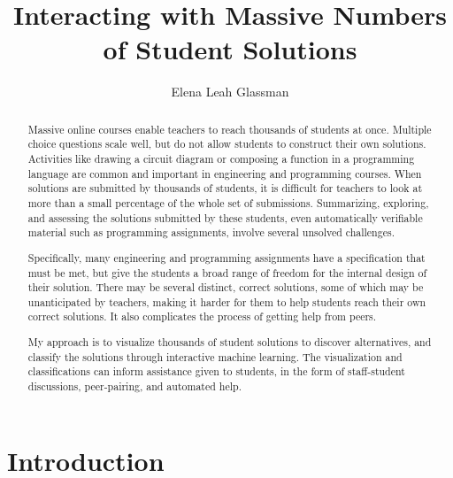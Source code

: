 \documentclass{sigchi}
\begin{document}
\title{Interacting with Massive Numbers of Student Solutions}

\author{
  \alignauthor Elena Leah Glassman 
}

\maketitle

\begin{abstract}
Massive online courses enable teachers to reach thousands of students at once. Multiple choice questions scale well, but do not allow students to construct their own solutions. Activities like drawing a circuit diagram or composing a function in a programming language are common and important in engineering and programming courses. When solutions are submitted by thousands of students, it is difficult for teachers to look at more than a small percentage of the whole set of submissions. Summarizing, exploring, and assessing the solutions submitted by these students, even automatically verifiable material such as programming assignments, involve several unsolved challenges. 

Specifically, many engineering and programming assignments have a specification that must be met, but give the students a broad range of freedom for the internal design of their solution. There may be several distinct, correct solutions, some of which may be unanticipated by teachers, making it harder for them to help students reach their own correct solutions. It also complicates the process of getting help from peers. 

My approach is to visualize thousands of student solutions to discover alternatives, and classify the solutions through interactive machine learning. The visualization and classifications can inform assistance given to students, in the form of staff-student discussions, peer-pairing, and automated help.
\end{abstract}



\section{Introduction}
\end{document}

